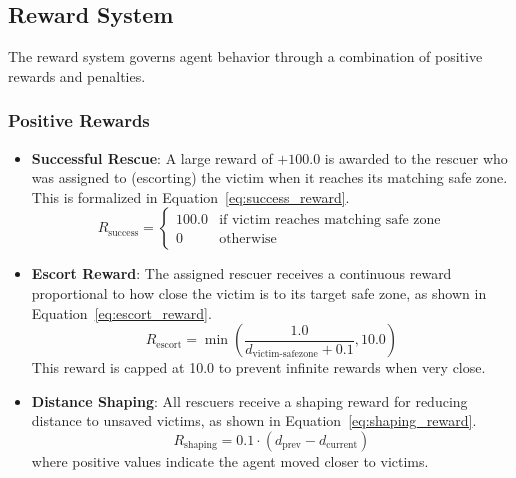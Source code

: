 \documentclass[11pt,a4paper]{article}
\begin{document}
\subsection{Reward System}
\label{subsec:reward_system}

The reward system governs agent behavior through a combination of positive rewards and penalties.

\subsubsection{Positive Rewards}
\label{subsubsec:positive_rewards}

\begin{itemize}
    \item \textbf{Successful Rescue}: A large reward of $+100.0$ is awarded to the rescuer who was assigned to (escorting) the victim when it reaches its matching safe zone.
    This is formalized in Equation~\ref{eq:success_reward}.
    \begin{equation}
    \label{eq:success_reward}
    R_{\text{success}} = \begin{cases}
        100.0 & \text{if victim reaches matching safe zone} \\
        0 & \text{otherwise}
    \end{cases}
    \end{equation}

    \item \textbf{Escort Reward}: The assigned rescuer receives a continuous reward proportional to how close the victim is to its target safe zone, as shown in Equation~\ref{eq:escort_reward}.
    \begin{equation}
    \label{eq:escort_reward}
    R_{\text{escort}} = \min\left(\frac{1.0}{d_{\text{victim-safezone}} + 0.1}, 10.0\right)
    \end{equation}
    This reward is capped at 10.0 to prevent infinite rewards when very close.

    \item \textbf{Distance Shaping}: All rescuers receive a shaping reward for reducing distance to unsaved victims, as shown in Equation~\ref{eq:shaping_reward}.
    \begin{equation}
    \label{eq:shaping_reward}
    R_{\text{shaping}} = 0.1 \cdot (d_{\text{prev}} - d_{\text{current}})
    \end{equation}
    where positive values indicate the agent moved closer to victims.
\end{itemize}
\end{document}

